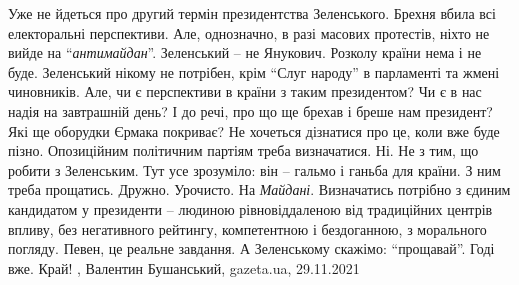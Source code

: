 Уже не йдеться про другий термін президентства Зеленського. Брехня вбила всі
електоральні перспективи. Але, однозначно, в разі масових протестів, ніхто не
вийде на \enquote{\emph{антимайдан}}. Зеленський – не Янукович. Розколу країни нема і не буде.
Зеленський нікому не потрібен, крім \enquote{Слуг народу} в парламенті та жмені
чиновників.  Але, чи є перспективи в країни з таким президентом? Чи є в нас
надія на завтрашній день? І до речі, про що ще брехав і бреше нам президент?
Які ще оборудки Єрмака покриває? Не хочеться дізнатися про це, коли вже буде
пізно.  Опозиційним політичним партіям треба визначатися. Ні. Не з тим, що
робити з Зеленським. Тут усе зрозуміло: він – гальмо і ганьба для країни. З ним
треба прощатись. Дружно. Урочисто. На \emph{Майдані}.  Визначатись потрібно з єдиним
кандидатом у президенти – людиною рівновіддаленою від традиційних центрів
впливу, без негативного рейтингу, компетентною і бездоганною, з морального
погляду. Певен, це реальне завдання.  А Зеленському скажімо: \enquote{прощавай}. Годі
вже. Край!
, 
Валентин Бушанський, gazeta.ua, 29.11.2021

